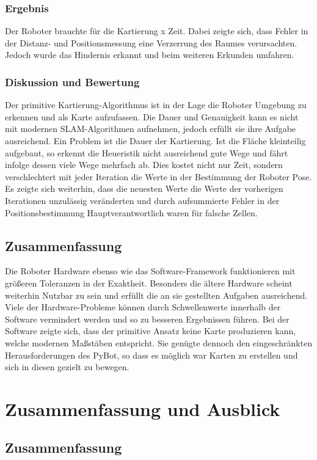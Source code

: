 \documentclass[twoside,12pt,a4paper]{report}
\begin{document}
	\subsection{Ergebnis}
	Der Roboter brauchte für die Kartierung x Zeit. Dabei zeigte sich, dass Fehler in der Distanz- und Positionsmessung eine Verzerrung des Raumes verursachten. Jedoch wurde das Hindernis erkannt und beim weiteren Erkunden umfahren. 
	
	\subsection{Diskussion und Bewertung}
	Der primitive Kartierung-Algorithmus ist in der Lage die Roboter Umgebung zu erkennen und als Karte aufzufassen. Die Dauer und Genauigkeit kann es nicht mit modernen SLAM-Algorithmen aufnehmen, jedoch erfüllt sie ihre Aufgabe ausreichend. Ein Problem ist die Dauer der Kartierung. Ist die Fläche kleinteilig aufgebaut, so erkennt die Heueristik nicht ausreichend gute Wege und fährt infolge dessen viele Wege mehrfach ab. Dies kostet nicht nur Zeit, sondern verschlechtert mit jeder Iteration die Werte in der Bestimmung der Roboter Pose. Es zeigte sich weiterhin, dass die neuesten Werte die Werte der vorherigen Iterationen unzulässig veränderten und durch aufsummierte Fehler in der Positionsbestimmung Hauptverantwortlich waren für falsche Zellen. 
	
	\section{Zusammenfassung}
	Die Roboter Hardware ebenso wie das Software-Framework funktionieren mit größeren Toleranzen in der Exaktheit. Besonders die ältere Hardware scheint weiterhin Nutzbar zu sein und erfüllt die an sie gestellten Aufgaben ausreichend. Viele der Hardware-Probleme können durch Schwellenwerte innerhalb der Software vermindert werden und so zu besseren Ergebnissen führen. Bei der Software zeigte sich, dass der primitive Ansatz keine Karte produzieren kann, welche modernen Maßstäben entspricht. Sie genügte dennoch den eingeschränkten Herausforderungen des PyBot, so dass es möglich war Karten zu erstellen und sich in diesen gezielt zu bewegen. 
	
	
	\chapter{Zusammenfassung und Ausblick}
	
	\section{Zusammenfassung}
	
\end{document}
